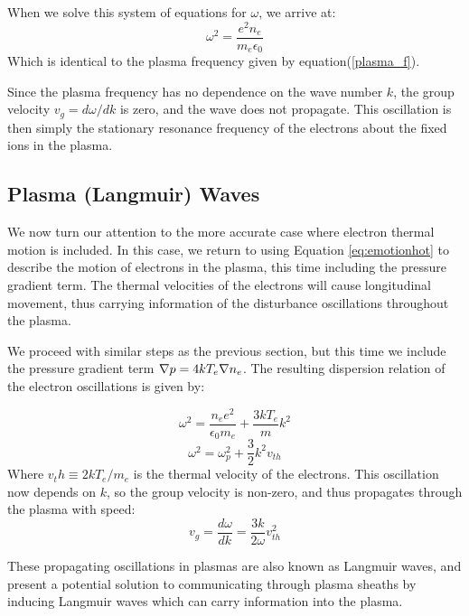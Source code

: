 \documentclass[twocolumn]{article}
\begin{document}
When we solve this system of equations for $\omega$, we arrive at:
\begin{equation}
	\omega^2 = \frac{e^2 n_e}{m_e\epsilon_0}
\end{equation}
Which is identical to the plasma frequency given by equation(\ref{plasma_f}).

Since the plasma frequency has no dependence on the wave number $k$, the group velocity $v_g = d\omega/dk$ is zero, and the wave does not propagate.
This oscillation is then simply the stationary resonance frequency of the electrons about the fixed ions in the plasma.
\subsection*{Plasma (Langmuir) Waves}
	We now turn our attention to the more accurate case where electron thermal motion is included.
	In this case, we return to using Equation \ref{eq:emotionhot} to describe the motion of electrons in the plasma, this time including the pressure gradient term.
	The thermal velocities of the electrons will cause longitudinal movement, thus carrying information of the disturbance oscillations throughout the plasma.
	
	We proceed with similar steps as the previous section, but this time we include the pressure gradient term $\\\nabla p = 4kT_e\nabla n_e$.
	The resulting dispersion relation of the electron oscillations is given by:
	
	\begin{equation*}
		\omega^2 = \frac{n_e e^2}{\epsilon_0 m_e} + \frac{3kT_e}{m}k^2
	\end{equation*}
	\begin{equation}
		\omega^2 = \omega^2_p + \frac{3}{2}k^2 v_{th}
	\end{equation}
	Where $v_th \equiv 2kT_e/m_e$ is the thermal velocity of the electrons.
	This oscillation now depends on $k$, so the group velocity is non-zero, and thus propagates through the plasma with speed:
	\begin{equation}
		v_g = \frac{d\omega}{dk} = \frac{3k}{2\omega}v^2_{th}
	\end{equation}
	
	These propagating oscillations in plasmas are also known as Langmuir waves, and present a potential solution to communicating through plasma sheaths by inducing Langmuir waves which can carry information into the plasma.
	
\end{document}
